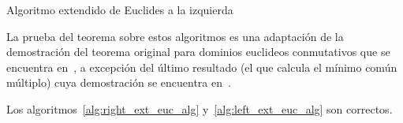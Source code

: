 \begin{algorithm}[ht]\label{alg:left_ext_euc_alg}
 \caption{Algoritmo extendido de Euclides a la izquierda}
\end{algorithm}

La prueba del teorema sobre estos algoritmos es una adaptación de la demostración del teorema original para dominios euclideos conmutativos que se encuentra en~\cite{algI}, a excepción del último resultado (el que calcula el mínimo común múltiplo) cuya demostración se encuentra en~\cite{bueso2003algorithmic}.
\begin{theorem}
    Los algoritmos~\ref{alg:right_ext_euc_alg} y~\ref{alg:left_ext_euc_alg} son correctos.
\end{theorem}

